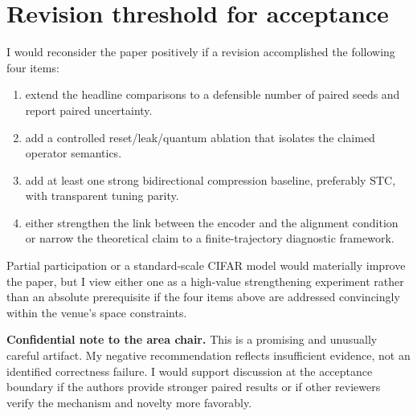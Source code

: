 \documentclass[10pt]{article}
\begin{document}
\section*{Revision threshold for acceptance}

I would reconsider the paper positively if a revision accomplished the
following four items:

\begin{enumerate}
  \item extend the headline comparisons to a defensible number of paired seeds
  and report paired uncertainty.
  \item add a controlled reset/leak/quantum ablation that isolates the claimed
  operator semantics.
  \item add at least one strong bidirectional compression baseline, preferably
  STC, with transparent tuning parity.
  \item either strengthen the link between the encoder and the alignment
  condition or narrow the theoretical claim to a finite-trajectory diagnostic
  framework.
\end{enumerate}

Partial participation or a standard-scale CIFAR model would materially improve
the paper, but I view either one as a high-value strengthening experiment
rather than an absolute prerequisite if the four items above are addressed
convincingly within the venue's space constraints.

\medskip
\textbf{Confidential note to the area chair.}
This is a promising and unusually careful artifact. My negative recommendation
reflects insufficient evidence, not an identified correctness failure. I would
support discussion at the acceptance boundary if the authors provide stronger
paired results or if other reviewers verify the mechanism and novelty more
favorably.
\end{document}
